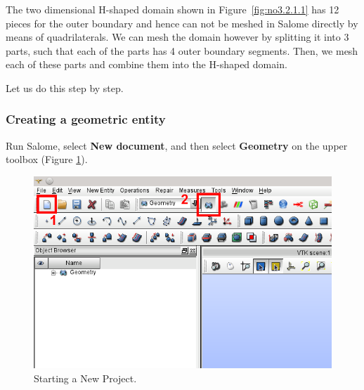 The two dimensional H-shaped domain shown in Figure~\ref{fig:no3.2.1.1} has 12 pieces for the outer boundary and hence can not be meshed in Salome directly by means of quadrilaterals. We can mesh the domain however by splitting it into 3 parts, such that each of the parts has 4 outer boundary segments. Then, we mesh each of these parts and combine them into the H-shaped domain.

Let us do this step by step.

\subsubsection{Creating a geometric entity}

Run Salome, select \textbf{New document}, and then select \textbf{Geometry} on the upper toolbox (Figure \ref{fig:no3.2.1.4}). 

\begin{figure}[h!]
\begin{center}
\includegraphics[scale=0.60]{figures/SalomeStep1.png}
\caption{Starting a New Project.}
\label{fig:no3.2.1.4}
\end{center}
\end{figure}
  
